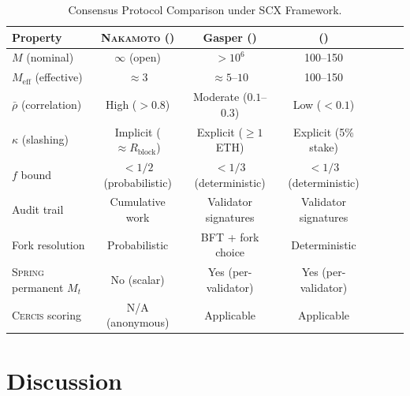 \documentclass[11pt,a4paper]{article}
\theoremstyle{definition}
\newcommand{\Spring}{\textsc{Spring}}
\newcommand{\Cercis}{\textsc{Cercis}}
\newcommand{\SCX}{\textsc{SCX}}
\newcommand{\Nakamoto}{\textsc{Nakamoto}}
\newcommand{\PoW}{\mathrm{PoW}}
\newcommand{\PoS}{\mathrm{PoS}}
\newcommand{\PBFT}{\mathrm{PBFT}}
\newcommand{\Tendermint}{\mathrm{Tendermint}}
\begin{document}
\begin{table}[htbp]
\centering
\caption{Consensus Protocol Comparison under \SCX{} Framework.}
\label{tab:protocol_comparison}
\begin{tabular}{lcccccc}
\toprule
\textbf{Property} & \textbf{\Nakamoto{} (\PoW{})} & \textbf{Gasper (\PoS{})} & \textbf{\Tendermint{} (\PBFT{})} \\
\midrule
$M$ (nominal) & $\infty$ (open) & $>10^6$ & 100--150 \\
$M_{\mathrm{eff}}$ (effective) & $\approx 3$ & $\approx 5$--$10$ & 100--150 \\
$\bar{\rho}$ (correlation) & High ($>0.8$) & Moderate ($0.1$--$0.3$) & Low ($<0.1$) \\
$\kappa$ (slashing) & Implicit ($\approx R_{\mathrm{block}}$) & Explicit ($\geq 1$ ETH) & Explicit (5\% stake) \\
$f$ bound & $< 1/2$ (probabilistic) & $< 1/3$ (deterministic) & $< 1/3$ (deterministic) \\
Audit trail & Cumulative work & Validator signatures & Validator signatures \\
Fork resolution & Probabilistic & BFT + fork choice & Deterministic \\
\Spring{} permanent $M_t$ & No (scalar) & Yes (per-validator) & Yes (per-validator) \\
\Cercis{} scoring & N/A (anonymous) & Applicable & Applicable \\
\bottomrule
\end{tabular}
\end{table}
\section{Discussion}
\label{sec:discussion}
\end{document}
